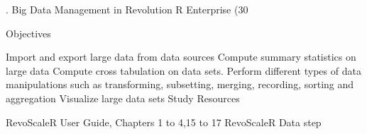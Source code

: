 . Big Data Management in Revolution R Enterprise (30%

Objectives

Import and export large data from data sources
Compute summary statistics on large data
Compute cross tabulation on data sets.
Perform different types of data manipulations such as transforming, subsetting, merging, recording, sorting and aggregation
Visualize large data sets
Study Resources

RevoScaleR User Guide, Chapters 1 to 4,15 to 17
RevoScaleR Data step
